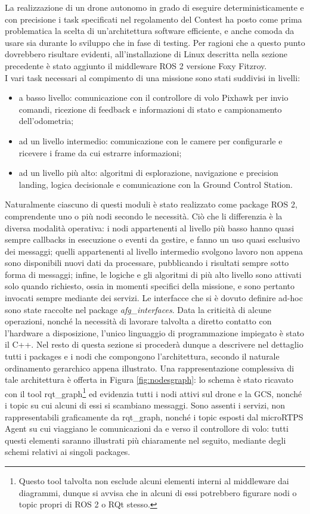 \indent La realizzazione di un drone autonomo in grado di eseguire deterministicamente e con precisione i task specificati nel regolamento del Contest ha posto come prima problematica la scelta di un'architettura software efficiente, e anche comoda da usare sia durante lo sviluppo che in fase di testing. Per ragioni che a questo punto dovrebbero risultare evidenti, all'installazione di Linux descritta nella sezione precedente è stato aggiunto il middleware ROS 2 versione Foxy Fitzroy.\\
I vari task necessari al compimento di una missione sono stati suddivisi in livelli:
\begin{itemize}
    \item a basso livello: comunicazione con il controllore di volo Pixhawk per invio comandi, ricezione di feedback e informazioni di stato e campionamento dell'odometria;
    \item ad un livello intermedio: comunicazione con le camere per configurarle e ricevere i frame da cui estrarre informazioni;
    \item ad un livello più alto: algoritmi di esplorazione, navigazione e precision landing, logica decisionale e comunicazione con la Ground Control Station.
\end{itemize}
Naturalmente ciascuno di questi moduli è stato realizzato come package ROS 2, comprendente uno o più nodi secondo le necessità. Ciò che li differenzia è la diversa modalità operativa: i nodi appartenenti al livello più basso hanno quasi sempre callbacks in esecuzione o eventi da gestire, e fanno un uso quasi esclusivo dei messaggi; quelli appartenenti al livello intermedio svolgono lavoro non appena sono disponibili nuovi dati da processare, pubblicando i risultati sempre sotto forma di messaggi; infine, le logiche e gli algoritmi di più alto livello sono attivati solo quando richiesto, ossia in momenti specifici della missione, e sono pertanto invocati sempre mediante dei servizi. Le interfacce che si è dovuto definire ad-hoc sono state raccolte nel package \emph{afg\_interfaces}. Data la criticità di alcune operazioni, nonché la necessità di lavorare talvolta a diretto contatto con l'hardware a disposizione, l'unico linguaggio di programmazione impiegato è stato il C++. Nel resto di questa sezione si procederà dunque a descrivere nel dettaglio tutti i packages e i nodi che compongono l'architettura, secondo il naturale ordinamento gerarchico appena illustrato. Una rappresentazione complessiva di tale architettura è offerta in Figura \ref{fig:nodesgraph}: lo schema è stato ricavato con il tool rqt\_graph\footnote{Questo tool talvolta non esclude alcuni elementi interni al middleware dai diagrammi, dunque si avvisa che in alcuni di essi potrebbero figurare nodi o topic propri di ROS 2 o RQt stesso.} ed evidenzia tutti i nodi attivi sul drone e la GCS, nonché i topic su cui alcuni di essi si scambiano messaggi. Sono assenti i servizi, non rappresentabili graficamente da rqt\_graph, nonché i topic esposti dal microRTPS Agent su cui viaggiano le comunicazioni da e verso il controllore di volo: tutti questi elementi saranno illustrati più chiaramente nel seguito, mediante degli schemi relativi ai singoli packages.\\

